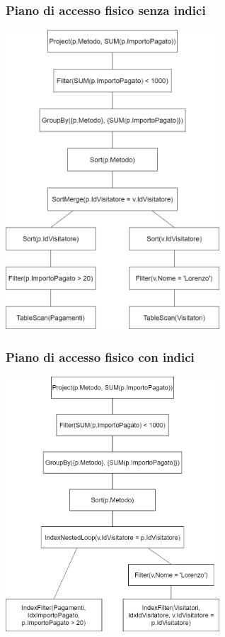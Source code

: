\documentclass[a4paper, 12pt]{article}
\begin{document}
\subsubsection{Piano di accesso fisico senza indici}
\begin{center}
    \includegraphics[width=8cm]{pianoFisicoQueryC.png}
\end{center}
\subsubsection{Piano di accesso fisico con indici}
\begin{center}
    \includegraphics[width=8cm]{pianoIdxQueryC.png}
\end{center}
\end{document}
